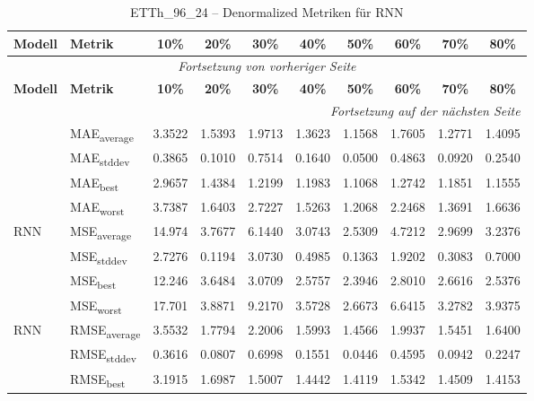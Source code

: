 {\small
\begin{longtable}{l l c c c c c c c c}
    \toprule
    \textbf{Modell} & \textbf{Metrik} & \textbf{10\%} & \textbf{20\%} & \textbf{30\%} & \textbf{40\%} & \textbf{50\%} & \textbf{60\%} & \textbf{70\%} & \textbf{80\%} \\
    \midrule
    \endfirsthead
    \multicolumn{10}{c}{\textit{Fortsetzung von vorheriger Seite}} \\
    \toprule
    \textbf{Modell} & \textbf{Metrik} & \textbf{10\%} & \textbf{20\%} & \textbf{30\%} & \textbf{40\%} & \textbf{50\%} & \textbf{60\%} & \textbf{70\%} & \textbf{80\%} \\
    \midrule
    \endhead
    \midrule
    \multicolumn{10}{r}{\textit{Fortsetzung auf der nächsten Seite}} \\
    \midrule
    \endfoot
    \bottomrule
    \caption{ETTh_96_24 -- Denormalized Metriken für RNN}
    \label{tab:etth_96_24_denormalized_rnn}
    \endlastfoot
\multirow{4}{*}{RNN} & MAE\textsubscript{average} & 3.3522 & 1.5393 & 1.9713 & 1.3623 & 1.1568 & 1.7605 & 1.2771 & 1.4095 \\
 & MAE\textsubscript{stddev} & 0.3865 & 0.1010 & 0.7514 & 0.1640 & 0.0500 & 0.4863 & 0.0920 & 0.2540 \\
 & MAE\textsubscript{best} & 2.9657 & 1.4384 & 1.2199 & 1.1983 & 1.1068 & 1.2742 & 1.1851 & 1.1555 \\
 & MAE\textsubscript{worst} & 3.7387 & 1.6403 & 2.7227 & 1.5263 & 1.2068 & 2.2468 & 1.3691 & 1.6636 \\
\cmidrule(lr){2-10}
\multirow{4}{*}{RNN} & MSE\textsubscript{average} & 14.974 & 3.7677 & 6.1440 & 3.0743 & 2.5309 & 4.7212 & 2.9699 & 3.2376 \\
 & MSE\textsubscript{stddev} & 2.7276 & 0.1194 & 3.0730 & 0.4985 & 0.1363 & 1.9202 & 0.3083 & 0.7000 \\
 & MSE\textsubscript{best} & 12.246 & 3.6484 & 3.0709 & 2.5757 & 2.3946 & 2.8010 & 2.6616 & 2.5376 \\
 & MSE\textsubscript{worst} & 17.701 & 3.8871 & 9.2170 & 3.5728 & 2.6673 & 6.6415 & 3.2782 & 3.9375 \\
\cmidrule(lr){2-10}
\multirow{4}{*}{RNN} & RMSE\textsubscript{average} & 3.5532 & 1.7794 & 2.2006 & 1.5993 & 1.4566 & 1.9937 & 1.5451 & 1.6400 \\
 & RMSE\textsubscript{stddev} & 0.3616 & 0.0807 & 0.6998 & 0.1551 & 0.0446 & 0.4595 & 0.0942 & 0.2247 \\
 & RMSE\textsubscript{best} & 3.1915 & 1.6987 & 1.5007 & 1.4442 & 1.4119 & 1.5342 & 1.4509 & 1.4153 \\

\end{longtable}}
